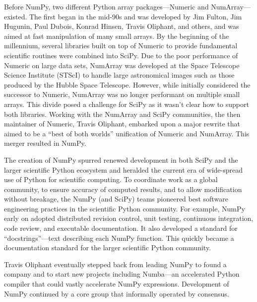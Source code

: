Before NumPy, two different Python array packages—Numeric and NumArray—existed.
The first began in the mid-90s and was developed by Jim Fulton, Jim Hugunin,
Paul Dubois, Konrad Hinsen, Travis Oliphant, and others, and was aimed at fast
manipulation of many small arrays.
By the beginning of the millennium, several libraries built on top of Numeric 
to provide fundamental scientific routines were combined into SciPy.
Due to the poor performance of Numeric on large data sets, NumArray was
developed at the Space Telescope Science Institute (STScI) to handle
large astronomical images such as those produced by the Hubble Space Telescope.
However, while initially considered the successor to Numeric, NumArray was no longer
performant on multiple small arrays.
This divide posed a challenge for SciPy as it wasn't clear how to support
both libraries.
Working with the NumArray and SciPy communities, the then maintainer of Numeric,
Travis Oliphant, embarked upon a major rewrite that aimed to be a ``best of both
worlds'' unification of Numeric and NumArray. This merger resulted in NumPy.

The creation of NumPy spurred renewed development in both SciPy and the larger
scientific Python ecosystem and heralded the current era of wide-spread use of
Python for scientific computing.
To coordinate work as a global community, to ensure accuracy of computed
results, and to allow modification without breakage, the NumPy (and SciPy) teams
pioneered best software engineering practices in the scientific Python
community\cite{millman2014developing}.
For example, NumPy early on adopted distributed revision control, unit testing,
continuous integration, code review, and executable documentation.
It also developed a standard for ``docstrings''—text describing each NumPy function.
This quickly became a documentation standard for the larger scientific Python community. 

Travis Oliphant eventually stepped back from leading NumPy to found a
company and to start new projects including Numba---an accelerated Python
compiler that could vastly accelerate NumPy expressions.  Development
of NumPy continued by a core group that informally operated by
consensus.



